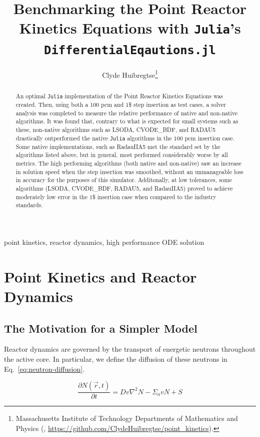 \documentclass[review,onefignum,onetabnum]{siamart171218}
\title{Benchmarking the Point Reactor Kinetics Equations with \texttt{Julia}'s \texttt{DifferentialEqautions.jl}}
\author{Clyde Huibregtse\thanks{Massachusetts Institute of Technology Departments of Mathematics and Physics
  (\email{huibregc@mit.edu}, \url{https://github.com/ClydeHuibregtse/point_kinetics}).}}
\begin{document}
\maketitle

\begin{abstract}
An optimal \texttt{Julia} implementation of the Point Reactor Kinetics Equations
was created. Then, using both a $100$ pcm and $1$\$ step insertion as test
cases, a solver analysis was completed to measure the relative performance of native
and non-native algorithms. It was found that, contrary to what is expected for small
systems such as these, non-native algorithms such as LSODA, CVODE\_BDF, and RADAU5
drastically outperformed the native \texttt{Julia} algorithms in the $100$ pcm insertion case.
Some native implementations,
such as RadauIIA5 met the standard set by the algorithms listed above, but in general,
most performed considerably worse by all metrics. The high performing algorithms (both
native and non-native) saw an increase in solution speed when the step insertion was
smoothed, without an unmanageable loss in accuracy for the purposes of this simulator.
Additonally, at low tolerances, some algorithms (LSODA, CVODE\_BDF, RADAU5, and RadauIIA5)
proved to achieve moderately low error in the $1$\$ insertion case when compared
to the industry standards.
\end{abstract}

\begin{keywords}
  point kinetics, reactor dynamics, high performance ODE solution
\end{keywords}


\section{Point Kinetics and Reactor Dynamics}

\subsection{The Motivation for a Simpler Model}
Reactor dynamics are governed by the transport of energetic neutrons
throughout the active core. In particular, we define the diffusion
of these neutrons in Eq.~\cref{eq:neutron-diffusion}.

\begin{equation}
  \label{eq:neutron-diffusion}
  \frac{\partial N(\vec{r}, t)}{\partial t} = Dv\nabla^2N - \Sigma_a v N + S
\end{equation}
\end{document}
